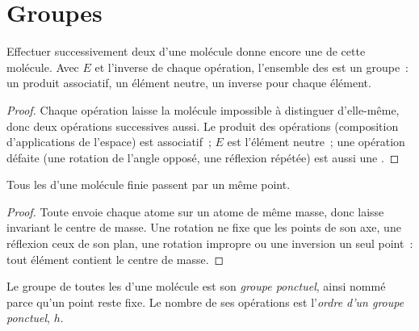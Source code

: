 \section{Groupes}

\begin{proposition}\label{prop:b3:point-groups:closure}
Effectuer successivement deux  d'une molécule
donne encore une  de cette molécule. Avec $E$ et
l'inverse de chaque opération, l'ensemble des  est
un groupe~: un produit associatif, un élément neutre, un inverse pour
chaque élément.
\end{proposition}

\begin{proof}
Chaque opération laisse la molécule impossible à distinguer d'elle-même,
donc deux opérations successives aussi. Le produit des opérations
(composition d'applications de l'espace) est associatif~; $E$ est
l'élément neutre~; une opération défaite (une rotation de l'angle
opposé, une réflexion répétée) est aussi une .
\end{proof}

\begin{proposition}\label{prop:b3:point-groups:fixed-point}
Tous les  d'une molécule finie passent par un même
point.
\end{proposition}

\begin{proof}
Toute  envoie chaque atome sur un atome de même
masse, donc laisse invariant le centre de masse. Une rotation ne fixe
que les points de son axe, une réflexion ceux de son plan, une rotation
impropre ou une inversion un seul point~: tout élément contient le centre
de masse.
\end{proof}

\begin{definition}\label{def:b3:point-groups:point-group}
Le groupe de toutes les  d'une molécule est son
\emph{groupe ponctuel}, ainsi nommé parce qu'un
point reste fixe. Le nombre de
ses opérations est l'\emph{ordre d'un groupe ponctuel},
$h$.
\end{definition}

